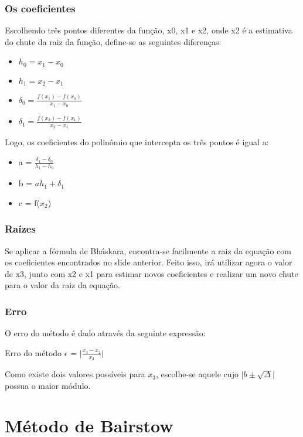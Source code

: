 \documentclass{beamer}
\begin{document}
\begin{frame}
\frametitle{Os coeficientes}
	Escolhendo três pontos diferentes da função, x0, x1 e x2, onde x2 é a estimativa do chute da raiz da função, define-se as seguintes diferenças:
	\begin{itemize}
		\item $h_0 = x_1 -x_0$
		\item $h_1 = x_2 -x_1$
		\item $\delta_0 = \frac{f\left(x_1\right) - f\left(x_0\right)}{x_1 - x_0}$
		\item $\delta_1 = \frac{f\left(x_2\right) - f\left(x_1\right)}{x_2-x_1}$
    \end{itemize}

    Logo, os coeficientes do polinômio que intercepta os três pontos é igual a:
	\begin{itemize}
		\item a = $\frac{\delta_1 - \delta_0}{h_1 - h_0}$
		\item b = $ah_1 + \delta_1$
		\item c = f($x_2$)
	\end{itemize}    
\end{frame}

\begin{frame}
\frametitle{Raízes}
Se aplicar a fórmula de Bháskara, encontra-se facilmente a raiz da equação com os coeficientes encontrados no slide anterior. Feito isso, irá utilizar agora o valor de x3, junto com x2 e x1 para estimar novos coeficientes e realizar um novo chute para o valor da raiz da equação.
\end{frame}

\begin{frame}
\frametitle{Erro}
	O erro do método é dado através da seguinte expressão:
	\begin{block}{Erro do método}
		$\epsilon$ = $\vert \frac{x_3 - x_2}{x_3} \vert$
	\end{block}

	Como existe dois valores possíveis para $x_3$, escolhe-se aquele cujo $\vert b \pm \sqrt{\Delta} \vert$ possua o maior módulo.
\end{frame}

\section{Método de Bairstow}
\end{document}
